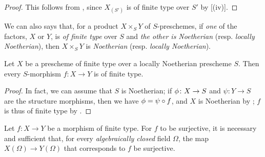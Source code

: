 \begin{proof}
\label{proof-1.6.3.8}
This follows from , since $X_{(S')}$ is of finite type over $S'$ by [(iv)].
\end{proof}

We can also says that, for a product $X\times_S Y$ of $S$-preschemes, if \emph{one} of the factors, $X$ or $Y$, is \emph{of finite type} over $S$ and \emph{the other is Noetherian} (resp. \emph{locally Noetherian}), then $X\times_S Y$ is \emph{Noetherian} (resp. \emph{locally Noetherian}).

\begin{cor}[6.3.9]
\label{1.6.3.9}
Let $X$ be a prescheme of finite type over a locally Noetherian prescheme $S$.
Then every $S$-morphism $f\colon X\to Y$ is of finite type.
\end{cor}

\begin{proof}
\label{proof-1.6.3.9}
In fact, we can assume that $S$ is Noetherian;
if $\phi\colon X\to S$ and $\psi\colon Y\to S$ are the structure morphisms, then we have $\phi=\psi\circ f$, and $X$ is Noetherian by ;
$f$ is thus of finite type by .
\end{proof}

\begin{prop}[6.3.10]
\label{1.6.3.10}
Let $f\colon X\to Y$ be a morphism of finite type.
For $f$ to be surjective, it is necessary and sufficient that, for every \emph{algebraically closed} field $\Omega$, the map $X(\Omega)\to Y(\Omega)$ that corresponds to $f$  be surjective.
\end{prop}

